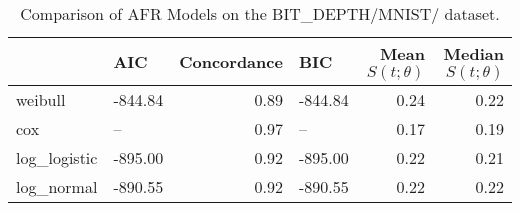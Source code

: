 \begin{table}
\caption{Comparison of AFR Models on the BIT_DEPTH/MNIST/ dataset.}
\label{tab:bit_depth/mnist/}
\begin{tabular}{llrlrr}
\toprule
 & AIC & Concordance & BIC & Mean $S(t;\theta)$ & Median $S(t;\theta)$ \\
\midrule
weibull & -844.84 & 0.89 & -844.84 & 0.24 & 0.22 \\
cox & -- & 0.97 & -- & 0.17 & 0.19 \\
log_logistic & -895.00 & 0.92 & -895.00 & 0.22 & 0.21 \\
log_normal & -890.55 & 0.92 & -890.55 & 0.22 & 0.22 \\
\bottomrule
\end{tabular}
\end{table}
